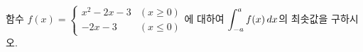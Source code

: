함수 $f(x)=\begin{cases} x^2-2x-3 & (x\ge 0) \\ -2x-3 & (x\le 0) \end{cases}$에 대하여 $\displaystyle\int_{-a}^{a} f(x)\mkern3mu dx$의 최솟값을 구하시오. 
